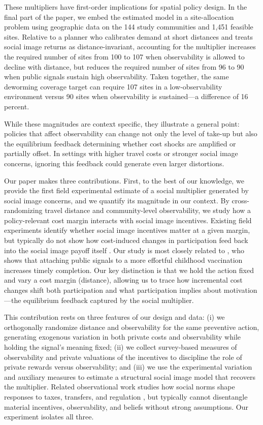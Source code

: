 \documentclass[12pt,a4paper]{article}
\begin{document}
These multipliers have first-order implications for spatial policy design. In the final part of the paper, we embed the estimated model in a site-allocation problem using geographic data on the 144 study communities and 1,451 feasible sites. Relative to a planner who calibrates demand at short distances and treats social image returns as distance-invariant, accounting for the multiplier increases the required number of sites from 100 to 107 when observability is allowed to decline with distance, but reduces the required number of sites from 96 to 90 when public signals sustain high observability. Taken together, the same deworming coverage target can require 107 sites in a low-observability environment versus 90 sites when observability is sustained---a difference of 16 percent.

While these magnitudes are context specific, they illustrate a general point: policies that affect observability can change not only the level of take-up but also the equilibrium feedback determining whether cost shocks are amplified or partially offset. In settings with higher travel costs or stronger social image concerns, ignoring this feedback could generate even larger distortions.

Our paper makes three contributions. First, to the best of our knowledge, we provide the first field experimental estimate of a social multiplier generated by social image concerns, and we quantify its magnitude in our context. By cross-randomizing travel distance and community-level observability, we study how a policy-relevant cost margin interacts with social image incentives. Existing field experiments identify whether social image incentives matter at a given margin, but typically do not show how cost-induced changes in participation feed back into the social image payoff itself \citep{bursztyn_social_2017,bursztyn_status_2018,chandrasekhar_social_2018,dellavigna_voting_2017,karing,breza19}. Our study is most closely related to \citet{karing}, who shows that attaching public signals to a more effortful childhood vaccination increases timely completion. Our key distinction is that we hold the action fixed and vary a cost margin (distance), allowing us to trace how incremental cost changes shift both participation and what participation implies about motivation---the equilibrium feedback captured by the social multiplier.

This contribution rests on three features of our design and data: (i) we orthogonally randomize distance and observability for the same preventive action, generating exogenous variation in both private costs and observability while holding the signal’s meaning fixed; (ii) we collect survey-based measures of observability and private valuations of the incentives to discipline the role of private rewards versus observability; and (iii) we use the experimental variation and auxiliary measures to estimate a structural social image model that recovers the multiplier. Related observational work studies how social norms shape responses to taxes, transfers, and regulation \citep[e.g.,][]{jia2019individual,besley2023norms,bobonis2025norms}, but typically cannot disentangle material incentives, observability, and beliefs without strong assumptions. Our experiment isolates all three.
\end{document}
